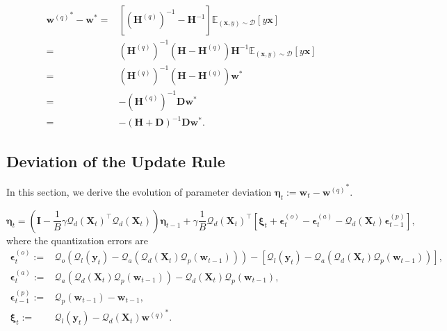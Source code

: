 \documentclass[11pt, letterpaper]{article}
\begin{document}
\begin{equation}
\label{wq-w*}
    \begin{aligned}
        {\mathbf{w}^{(q)}}^*-\mathbf{w}^*=&\left[(\mathbf{H}^{(q)})^{-1}-\mathbf{H}^{-1}\right]\mathbb{E}_{(\mathbf{x},y)\sim\mathcal{D}}[y\mathbf{x}]\\
        =&(\mathbf{H}^{(q)})^{-1}\left(\mathbf{H}-\mathbf{H}^{(q)}\right)\mathbf{H}^{-1}\mathbb{E}_{(\mathbf{x},y)\sim\mathcal{D}}[y\mathbf{x}]\\
        =&(\mathbf{H}^{(q)})^{-1}\left(\mathbf{H}-\mathbf{H}^{(q)}\right)\mathbf{w}^*\\
        =&-(\mathbf{H}^{(q)})^{-1}\mathbf{D}\mathbf{w}^*\\
        =&-\left(\mathbf{H}+\mathbf{D}\right)^{-1}\mathbf{D}\mathbf{w}^*.
    \end{aligned}
\end{equation}
\subsection{Deviation of the Update Rule}
\label{Deviation of the Update Rule}
In this section, we derive the evolution of parameter deviation $\boldsymbol{\eta}_{t}:=\mathbf{w}_{t}-{\mathbf{w}^{(q)}}^*$.
\begin{lemma}
\label{update rule for eta_t}
    \begin{equation*}
        \boldsymbol{\eta}_t = \left(\mathbf{I}-\frac{1}{B}\gamma {\mathcal{Q}_d(\mathbf{X}_t)}^\top \mathcal{Q}_d(\mathbf{X}_t) \right)\boldsymbol{\eta}_{t-1}+\gamma\frac{1}{B}{\mathcal{Q}_d(\mathbf{X}_t)}^\top \left[\boldsymbol{\xi}_t+\boldsymbol{\epsilon}_t^{(o)}-\boldsymbol{\epsilon}_t^{(a)}-\mathcal{Q}_d(\mathbf{X}_t)\boldsymbol{\epsilon}_{t-1}^{(p)}\right],
    \end{equation*}
    where the quantization errors are
    \begin{equation*}
        \begin{aligned}
            \boldsymbol{\epsilon}_t^{(o)}:=&\mathcal{Q}_o\left(\mathcal{Q}_l(\mathbf{y}_t)-\mathcal{Q}_a\left(\mathcal{Q}_d(\mathbf{X}_t)\mathcal{Q}_p(\mathbf{w}_{t-1})\right)\right)-\left[\mathcal{Q}_l(\mathbf{y}_t)-\mathcal{Q}_a\left(\mathcal{Q}_d(\mathbf{X}_t)\mathcal{Q}_p(\mathbf{w}_{t-1})\right)\right],\\
            \boldsymbol{\epsilon}_t^{(a)}:=&\mathcal{Q}_a\left(\mathcal{Q}_d(\mathbf{X}_t)\mathcal{Q}_p(\mathbf{w}_{t-1})\right)-\mathcal{Q}_d(\mathbf{X}_t)\mathcal{Q}_p(\mathbf{w}_{t-1}),\\
            \boldsymbol{\epsilon}_{t-1}^{(p)}:=&\mathcal{Q}_p(\mathbf{w}_{t-1})-\mathbf{w}_{t-1},\\
            \boldsymbol{\xi}_t:=&\mathcal{Q}_l(\mathbf{y}_t)-\mathcal{Q}_d(\mathbf{X}_t){\mathbf{w}^{(q)}}^*.
        \end{aligned}
    \end{equation*}
\end{lemma}
\end{document}
